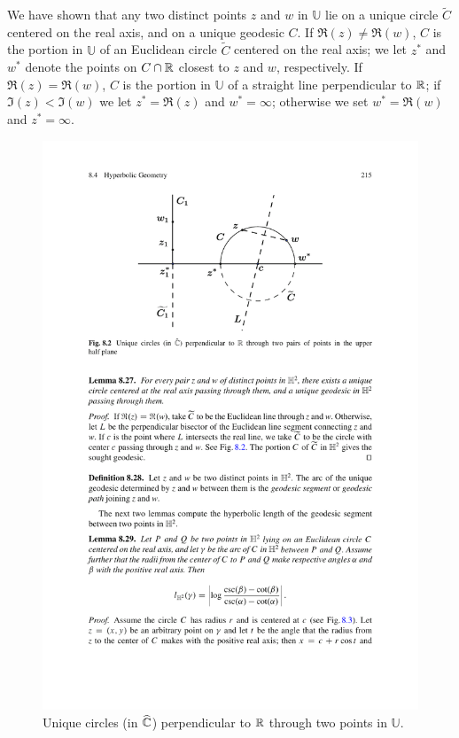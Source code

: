\begin{definition}
We have shown that any two distinct points $z$ and $w$ in $\mathbb{U}$ lie on a unique circle $\widetilde{C}$ centered on the real axis, and on a unique geodesic $C$. If $\Re(z)\neq\Re(w)$, $C$ is the portion in $\mathbb{U}$ of an Euclidean circle $\widetilde{C}$ centered on the real axis; we let $z^*$ and $w^*$ denote the points on $C\cap\mathbb{R}$ closest to $z$ and $w$, respectively. If $\Re(z)=\Re(w)$, $C$ is the portion in $\mathbb{U}$ of a straight line perpendicular to $\mathbb{R}$; if $\Im(z)<\Im(w)$ we let $z^*=\Re(z)$ and $w^*=\infty$; otherwise we set $w^*=\Re(w)$ and $z^*=\infty$.
\end{definition}
\begin{figure}[htbp]
\centering
\includegraphics{pictures/upper-plane-conjugate}
\caption{Unique circles (in $\widehat{\mathbb{C}}$) perpendicular to $\mathbb{R}$ through two points in $\mathbb{U}$.}
\end{figure}

